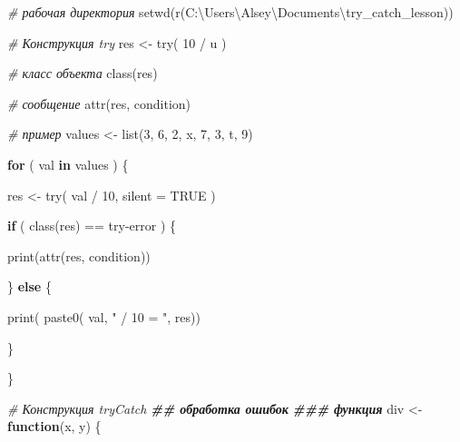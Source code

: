 \documentclass[
]{book}
\newenvironment{Shaded}{\begin{snugshade}}{\end{snugshade}}
\newcommand{\AttributeTok}[1]{\textcolor[rgb]{0.77,0.63,0.00}{#1}}
\newcommand{\CommentTok}[1]{\textcolor[rgb]{0.56,0.35,0.01}{\textit{#1}}}
\newcommand{\ConstantTok}[1]{\textcolor[rgb]{0.00,0.00,0.00}{#1}}
\newcommand{\ControlFlowTok}[1]{\textcolor[rgb]{0.13,0.29,0.53}{\textbf{#1}}}
\newcommand{\DecValTok}[1]{\textcolor[rgb]{0.00,0.00,0.81}{#1}}
\newcommand{\DocumentationTok}[1]{\textcolor[rgb]{0.56,0.35,0.01}{\textbf{\textit{#1}}}}
\newcommand{\FunctionTok}[1]{\textcolor[rgb]{0.00,0.00,0.00}{#1}}
\newcommand{\NormalTok}[1]{#1}
\newcommand{\OtherTok}[1]{\textcolor[rgb]{0.56,0.35,0.01}{#1}}
\newcommand{\SpecialCharTok}[1]{\textcolor[rgb]{0.00,0.00,0.00}{#1}}
\newcommand{\StringTok}[1]{\textcolor[rgb]{0.31,0.60,0.02}{#1}}
\begin{document}
\begin{Shaded}
\begin{Highlighting}[]
\CommentTok{\# рабочая директория}
\FunctionTok{setwd}\NormalTok{(r}\StringTok{\textquotesingle{}(C:\textbackslash{}Users\textbackslash{}Alsey\textbackslash{}Documents}\SpecialCharTok{\textbackslash{}t}\StringTok{ry\_catch\_lesson)\textquotesingle{}}\NormalTok{)}

\CommentTok{\# Конструкция try}
\NormalTok{res }\OtherTok{\textless{}{-}} \FunctionTok{try}\NormalTok{( }\DecValTok{10} \SpecialCharTok{/} \StringTok{\textquotesingle{}u\textquotesingle{}}\NormalTok{ )}

\CommentTok{\# класс объекта}
\FunctionTok{class}\NormalTok{(res)}

\CommentTok{\# сообщение}
\FunctionTok{attr}\NormalTok{(res, }\StringTok{\textquotesingle{}condition\textquotesingle{}}\NormalTok{)}

\CommentTok{\# пример }
\NormalTok{values }\OtherTok{\textless{}{-}} \FunctionTok{list}\NormalTok{(}\DecValTok{3}\NormalTok{, }\DecValTok{6}\NormalTok{, }\DecValTok{2}\NormalTok{, }\StringTok{\textquotesingle{}x\textquotesingle{}}\NormalTok{, }\DecValTok{7}\NormalTok{, }\DecValTok{3}\NormalTok{, }\StringTok{\textquotesingle{}t\textquotesingle{}}\NormalTok{, }\DecValTok{9}\NormalTok{)}

\ControlFlowTok{for}\NormalTok{ ( val }\ControlFlowTok{in}\NormalTok{ values ) \{}
  
\NormalTok{  res }\OtherTok{\textless{}{-}} \FunctionTok{try}\NormalTok{( val }\SpecialCharTok{/} \DecValTok{10}\NormalTok{, }\AttributeTok{silent =} \ConstantTok{TRUE}\NormalTok{ )}
  
  \ControlFlowTok{if}\NormalTok{ ( }\FunctionTok{class}\NormalTok{(res) }\SpecialCharTok{==} \StringTok{\textquotesingle{}try{-}error\textquotesingle{}}\NormalTok{ ) \{}
    
    \FunctionTok{print}\NormalTok{(}\FunctionTok{attr}\NormalTok{(res, }\StringTok{\textquotesingle{}condition\textquotesingle{}}\NormalTok{)) }
    
\NormalTok{  \} }\ControlFlowTok{else}\NormalTok{ \{}
    
    \FunctionTok{print}\NormalTok{( }\FunctionTok{paste0}\NormalTok{( val, }\StringTok{" / 10 = "}\NormalTok{, res))}
    
\NormalTok{  \}}
  
\NormalTok{\}}


\CommentTok{\# Конструкция tryCatch}
\DocumentationTok{\#\# обработка ошибок}
\DocumentationTok{\#\#\# функция}
\NormalTok{div }\OtherTok{\textless{}{-}} \ControlFlowTok{function}\NormalTok{(x, y) \{}
  

\end{Highlighting}
\end{Shaded}
\end{document}
